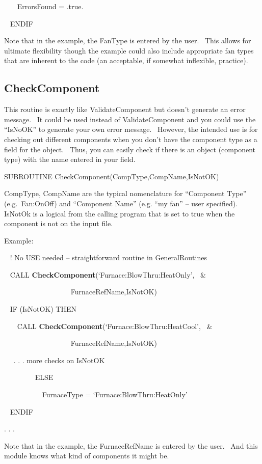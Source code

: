 ~~~ ErrorsFound = .true.

~ ENDIF

Note that in the example, the FanType is entered by the user.~ This allows for ultimate flexibility though the example could also include appropriate fan types that are inherent to the code (an acceptable, if somewhat inflexible, practice).

\subsection{CheckComponent}\label{checkcomponent}

This routine is exactly like ValidateComponent but doesn't generate an error message.~ It could be used instead of ValidateComponent and you could use the ``IsNoOK'' to generate your own error message.~ However, the intended use is for checking out different components when you don't have the component type as a field for the object.~ Thus, you can easily check if there is an object (component type) with the name entered in your field.

SUBROUTINE CheckComponent(CompType,CompName,IsNotOK)

CompType, CompName are the typical nomenclature for ``Component Type'' (e.g.~Fan:OnOff) and ``Component Name'' (e.g. ``my fan'' -- user specified).~ IsNotOk is a logical from the calling program that is set to true when the component is not on the input file.

Example:

~ ! No USE needed -- straightforward routine in GeneralRoutines

~ CALL \textbf{CheckComponent}(`Furnace:BlowThru:HeatOnly',~ \&

~~~~~~~~~~~~~~~~~~ FurnaceRefName,IsNotOK)

~ IF (IsNotOK) THEN

~~~ CALL \textbf{CheckComponent}(`Furnace:BlowThru:HeatCool',~ \&

~~~~~~~~~~~~~~~~~~ FurnaceRefName,IsNotOK)

~~ . . . more checks on IsNotOK

~~~~~~~~ ELSE

~~~~~~~~~~ FurnaceType = `Furnace:BlowThru:HeatOnly'

~ ENDIF

. . .

Note that in the example, the FurnaceRefName is entered by the user.~ And this module knows what kind of components it might be.

